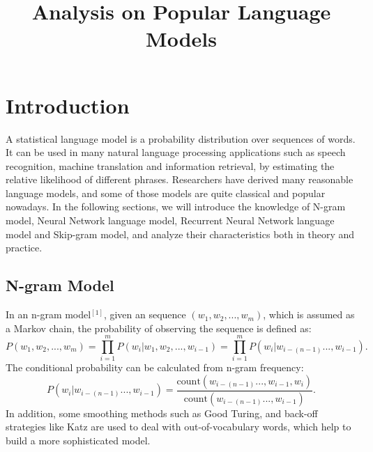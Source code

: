 \documentclass[11pt, oneside]{article}   	%
\title{Analysis on Popular Language Models}
\date{}							%
\begin{document}
\maketitle
\section{Introduction}
A statistical language model is a probability distribution over sequences of words. It can be used in many natural language processing applications such as speech recognition, machine translation and information retrieval, by estimating the relative likelihood of different phrases. Researchers have derived many reasonable language models, and some of those models are quite classical and popular nowadays. In the following sections, we will introduce the knowledge of N-gram model, Neural Network language model, Recurrent Neural Network language model and Skip-gram model, and analyze their characteristics both in theory and practice.
\subsection{N-gram Model}
In an n-gram model$^{[1]}$, given an sequence $(w_1,w_2,...,w_m)$, which is assumed as a Markov chain, the probability of observing the sequence is defined as:
\[
P(w_1,w_2,...,w_m)=\prod_{i=1}^{m}{P(w_i|w_1,w_2,...,w_{i-1})}= \prod_{i=1}^{m}{P(w_i|w_{i-(n-1)}...,w_{i-1})}.
\]
The conditional probability can be calculated from n-gram frequency:
\[
P(w_i|w_{i-(n-1)}...,w_{i-1})=\frac{\text{count}(w_{i-(n-1)}...,w_{i-1},w_{i})}{\text{count}(w_{i-(n-1)}...,w_{i-1})}.
\]
In addition, some smoothing methods such as Good Turing, and back-off strategies like Katz are used to deal with out-of-vocabulary words, which help to build a more sophisticated model.
\end{document}
